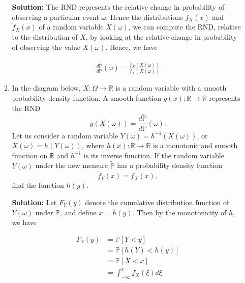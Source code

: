 \documentclass[12pt, a4paper]{article}
\begin{document}
\begin{enumerate}
\begin{enumerate}
        \textbf{Solution:} The RND represents the relative change in probability of observing a particular event $\omega$. Hence the distributions $f_X(x)$ and $\tilde f_X(x)$ of a random variable $X(\omega)$, we can compute the RND, relative to the distribution of $X$, by looking at the relative change in probability of observing the value $X(\omega)$. Hence, we have

        \begin{align*}
            \frac{d \tilde{\mathbb P}}{d\mathbb P}(\omega) = \frac{\tilde f_X(X(\omega))}{f_X(X(\omega))}
        \end{align*}

        \item In the diagram below, $X: \Omega \rightarrow \mathbb R$ is a random variable with a smooth probability density function. A smooth function $g(x): \mathbb R \rightarrow \mathbb R$ represents the RND $$g(X(\omega)) = \frac{d\tilde{\mathbb P}}{d\mathbb P}(\omega).$$
        Let us consider a random variable $Y(\omega) = h^{-1}(X(\omega))$, or $X(\omega) = h(Y(\omega))$, where $h(x) : \mathbb R \rightarrow \mathbb R$ is a monotonic and smooth function on $\mathbb R$ and $h^{-1}$ is its inverse function. If the random variable $Y(\omega)$ under the new measure $\tilde{\mathbb P}$ has a probability density function $$\tilde f_Y(x) = f_X(x),$$
        find the function $h(y)$. 

        \begin{center}
        \end{center}

        \textbf{Solution:} Let $F_Y(y)$ denote the cumulative distribution function of $Y(\omega)$ under $\mathbb P$, and define $x=h(y)$. Then by the monotonicity of $h$, we have

        \begin{align*}
            F_Y(y) &= \mathbb P[Y<y]\\
            &= \mathbb P[h(Y)<h(y)]\\
            &= \mathbb P[X < x] \\
            &= \int_{-\infty}^{x} f_X(\xi) d\xi
        \end{align*}


\end{enumerate}
\end{enumerate}
\end{document}
